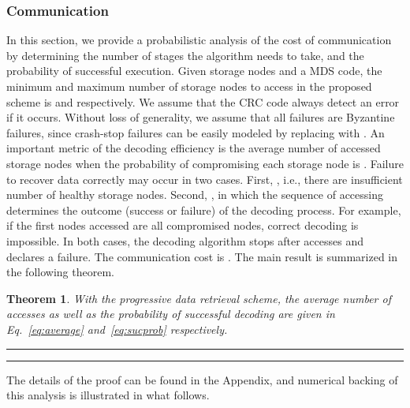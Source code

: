 \documentclass[10pt,journal,letterpaper,compsoc]{IEEEtran}
\newtheorem{theorem}{Theorem}
\newcommand{\0}{{\bf 0}}
\begin{document}
\subsubsection{Communication}
\label{sect:analysis}
In this section, we provide a probabilistic analysis of the cost of
communication by determining the number of stages the algorithm needs to take,
and the probability of successful execution. Given  storage nodes and a
MDS code, the minimum and maximum number of storage nodes to access
in the proposed scheme is  and  respectively. We assume that
the CRC code always detect an error if it occurs.  Without loss of
generality, we assume that all failures are Byzantine failures, since  crash-stop
failures can be easily modeled by replacing  with . An important metric
of the decoding efficiency is the average number of accessed storage nodes when
the probability of compromising each storage node is . Failure to recover
data correctly may occur in two cases. First, , i.e., there are
insufficient number of healthy storage nodes. Second,
, in which the sequence of accessing
determines the outcome (success or failure) of the decoding process.  For
example, if the first  nodes accessed are all compromised nodes, correct
decoding is impossible. In both cases, the decoding algorithm stops after 
accesses and declares a failure.  The communication cost is . 
The main result is summarized in the following theorem.
\begin{theorem}
With the progressive data retrieval scheme, the average number of accesses as well as the 
probability of successful decoding are given in Eq.~\eqref{eq:average} and~\eqref{eq:sucprob} respectively.
\begin{table*}
\par\noindent\rule{0.9\textwidth}{0.4pt}


\par\noindent\rule{0.9\textwidth}{0.4pt}\end{table*}
\label{thm:average_access}
\end{theorem}
The details of the proof can be found in the Appendix, and numerical 
backing of this analysis is illustrated in what follows.
\end{document}
